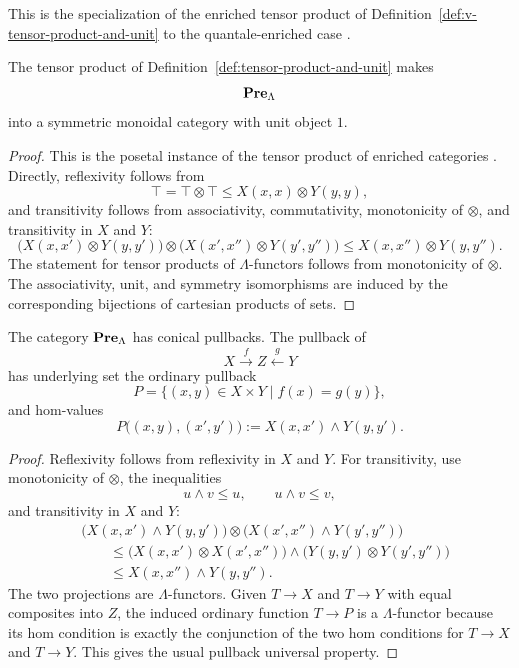 This is the specialization of the enriched tensor product of Definition~\ref{def:v-tensor-product-and-unit} to the quantale-enriched case \cite[Section~1.4, formulas~(1.17)--(1.18)]{Kelly1982BasicConcepts}.

\begin{proposition}
\label{prop:tensor-product-gives-symmetric-monoidal-structure}
    The tensor product of Definition~\ref{def:tensor-product-and-unit} makes
    \[
        \mathbf{Pre}_\Lambda
    \]
    into a symmetric monoidal category with unit object \(1\).
\end{proposition}

\begin{proof}
    This is the posetal instance of the tensor product of enriched categories \cite[Section~1.4]{Kelly1982BasicConcepts}. Directly, reflexivity follows from
    \[
        \top=\top\otimes\top
        \leq
        X(x,x)\otimes Y(y,y),
    \]
    and transitivity follows from associativity, commutativity, monotonicity of \(\otimes\), and transitivity in \(X\) and \(Y\):
    \[
        \bigl(X(x,x')\otimes Y(y,y')\bigr)
        \otimes
        \bigl(X(x',x'')\otimes Y(y',y'')\bigr)
        \leq
        X(x,x'')\otimes Y(y,y'').
    \]
    The statement for tensor products of \(\Lambda\)-functors follows from monotonicity of \(\otimes\). The associativity, unit, and symmetry isomorphisms are induced by the corresponding bijections of cartesian products of sets.
\end{proof}

\begin{lemma}
\label{lem:pullbacks-in-prelambda}
    The category \(\mathbf{Pre}_\Lambda\) has conical pullbacks. The pullback of
    \[
        X \xrightarrow{f} Z \xleftarrow{g} Y
    \]
    has underlying set the ordinary pullback
    \[
        P=\{(x,y)\in X\times Y\mid f(x)=g(y)\},
    \]
    and hom-values
    \[
        P\bigl((x,y),(x',y')\bigr)
        :=
        X(x,x')\wedge Y(y,y').
    \]
\end{lemma}

\begin{proof}
    Reflexivity follows from reflexivity in \(X\) and \(Y\). For transitivity, use monotonicity of \(\otimes\), the inequalities
    \[
        u\wedge v\leq u,
        \qquad
        u\wedge v\leq v,
    \]
    and transitivity in \(X\) and \(Y\):
    \[
        \begin{aligned}
        &
        \bigl(X(x,x')\wedge Y(y,y')\bigr)
        \otimes
        \bigl(X(x',x'')\wedge Y(y',y'')\bigr)
        \\
        &\qquad\leq
        \bigl(X(x,x')\otimes X(x',x'')\bigr)
        \wedge
        \bigl(Y(y,y')\otimes Y(y',y'')\bigr)
        \\
        &\qquad\leq
        X(x,x'')\wedge Y(y,y'').
        \end{aligned}
    \]
    The two projections are \(\Lambda\)-functors. Given \(T\to X\) and \(T\to Y\) with equal composites into \(Z\), the induced ordinary function \(T\to P\) is a \(\Lambda\)-functor because its hom condition is exactly the conjunction of the two hom conditions for \(T\to X\) and \(T\to Y\). This gives the usual pullback universal property.
\end{proof}

